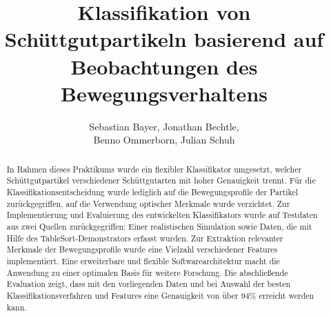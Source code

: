 \documentclass[cover]{isas-seminar}
\title{Klassifikation von Schüttgutpartikeln basierend auf Beobachtungen des Bewegungsverhaltens}
\author{Sebastian Bayer, Jonathan Bechtle,\\ Benno Ommerborn, Julian Schuh}
\begin{document}
\maketitle

\begin{abstract}
In Rahmen dieses Praktikums wurde ein flexibler Klassifikator umgesetzt, welcher Schüttgutpartikel verschiedener Schüttgutarten mit hoher Genauigkeit trennt. Für die Klassifikationsentscheidung wurde lediglich auf die Bewegungsprofile der Partikel zurückgegriffen, auf die Verwendung optischer Merkmale wurde verzichtet. Zur Implementierung und Evaluierung des entwickelten Klassifikators wurde auf Testdaten aus zwei Quellen zurückgegriffen: Einer realistischen Simulation \cite{DEM2016} sowie Daten, die mit Hilfe des TableSort-Demonstrators \cite{TableSort} erfasst wurden. Zur Extraktion relevanter Merkmale der Bewegungsprofile wurde eine Vielzahl verschiedener Features implementiert. Eine erweiterbare und flexible Softwarearchitektur macht die Anwendung zu einer optimalen Basis für weitere Forschung. Die abschließende Evaluation zeigt, dass mit den vorliegenden Daten und bei Auswahl der besten Klassifikationsverfahren und Features eine Genauigkeit von über 94\% erreicht werden kann.
\end{abstract}
\clearpage
\tableofcontents
\cleardoublepage











\end{document}
